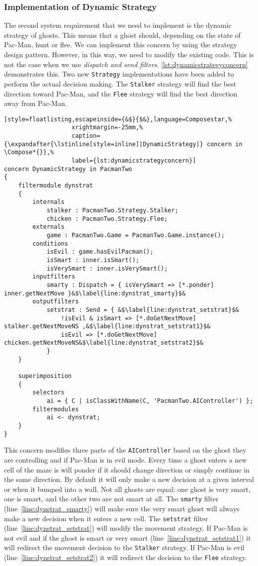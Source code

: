 \subsubsection{Implementation of Dynamic Strategy}

The second system requirement that we need to implement is the dynamic strategy of ghosts.
This means that a ghost should, depending on the state of Pac-Man, hunt or flee.
We can implement this concern by using the strategy design pattern.
However, in this way, we need to modify the existing code.
This is not the case when we use \Compose*{} \emph{dispatch and send filters}.
\autoref{lst:dynamicstrategyconcern} demonstrates this. 
Two new \lstinline|Strategy| implementations have been added to perform the actual decision making. The \lstinline|Stalker| strategy will find the best direction toward Pac-Man, and the \lstinline|Flee| strategy will find the best direction away from Pac-Man.

\begin{lstlisting}[style=floatlisting,escapeinside={&$}{$&},language=Composestar,%
                   xrightmargin=-25mm,%
                   caption={\expandafter{\lstinline[style=inline]|DynamicStrategy|} concern in \Compose*{}},%
                   label={lst:dynamicstrategyconcern}]
concern DynamicStrategy in PacmanTwo
{
	filtermodule dynstrat
	{
		internals
			stalker : PacmanTwo.Strategy.Stalker;
			chicken : PacmanTwo.Strategy.Flee;
		externals
			game : PacmanTwo.Game = PacmanTwo.Game.instance();
		conditions
			isEvil : game.hasEvilPacman();
			isSmart : inner.isSmart();
			isVerySmart : inner.isVerySmart();
		inputfilters
			smarty : Dispatch = { isVerySmart => [*.ponder] inner.getNextMove }&$\label{line:dynstrat_smarty}$&
		outputfilters
			setstrat : Send = { &$\label{line:dynstrat_setstrat}$&
				!isEvil & isSmart => [*.doGetNextMove] stalker.getNextMoveNS ,&$\label{line:dynstrat_setstrat1}$&
				isEvil => [*.doGetNextMove] chicken.getNextMoveNS&$\label{line:dynstrat_setstrat2}$&
			}
	}

	superimposition
	{
		selectors
			ai = { C | isClassWithName(C, 'PacmanTwo.AIController') };
		filtermodules
			ai <- dynstrat;
	}
}
\end{lstlisting}

This concern modifies three parts of the \lstinline|AIController| based on the ghost they are controlling and if Pac-Man is in evil mode. Every time a ghost enters a new cell of the maze is will ponder if it should change direction or simply continue in the same direction. By default it will only make a new decision at a given interval or when it bumped into a wall. Not all ghosts are equal: one ghost is very smart, one is smart, and the other two are not smart at all. 
The \lstinline|smarty| filter (line~\ref{line:dynstrat_smarty}) will make sure the very smart ghost will always make a new decision when it enters a new cell. The \lstinline|setstrat| filter (line~\ref{line:dynstrat_setstrat}) will modify the movement strategy. If Pac-Man is not evil and if the ghost is smart or very smart (line~\ref{line:dynstrat_setstrat1}) it will redirect the movement decision to the \lstinline|Stalker| strategy. If Pac-Man is evil (line~\ref{line:dynstrat_setstrat2}) it will redirect the decision to the \lstinline|Flee| strategy.


